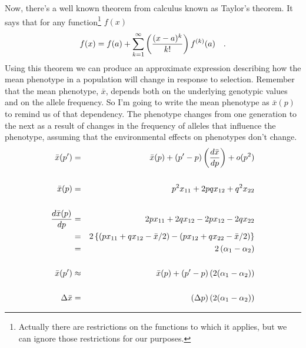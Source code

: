 \documentclass[12pt]{article}
\begin{document}
Now, there's a well known theorem from calculus known as Taylor's
theorem. It says that for any function\footnote{Actually there are
  restrictions on the functions to which it applies, but we can ignore
  those restrictions for our purposes.} $f(x)$
\[
f(x) = f(a) + \sum_{k=1}^\infty \left({{(x-a)^k} \over k!}\right)
                                 f^{(k)}(a) \quad .
\]
Using this theorem we can produce an approximate expression describing
how the mean phenotype in a population will change in response to
selection. Remember that the mean phenotype, $\bar x$, depends both on
the underlying genotypic values and on the allele frequency. So I'm
going to write the mean phenotype as $\bar x(p)$ to remind us of that
dependency. The phenotype changes from one generation to the next as a
result of changes in the frequency of alleles that influence the
phenotype, assuming that the environmental effects on phenotypes don't
change.
\begin{eqnarray*}
{\bar x}(p') &=& {\bar x}(p) + (p' - p)\left({d{\bar x} \over dp}\right)
             + o(p^2) \\
\\
{\bar x}(p) &=& p^2x_{11} + 2pqx_{12} + q^2x_{22} \\
\\
\frac{d{\bar x(p)}}{dp}
         &=& 2px_{11} + 2qx_{12} - 2px_{12} - 2qx_{22} \\
         &=& 2\left\{
             \left(px_{11} + qx_{12} - {\bar x}/2\right) -
             \left(px_{12} + qx_{22} - {\bar x}/2\right)\right\} \\
         &=& 2\left(\alpha_1 - \alpha_2\right) \\
\\
{\bar x}(p') &\approx& {\bar x}(p) + (p' - p)\left(2(\alpha_1 - \alpha_2)\right) \\
\\
\Delta{\bar x} &=& (\Delta p)\left(2(\alpha_1 - \alpha_2)\right)
\end{eqnarray*}
\end{document}
